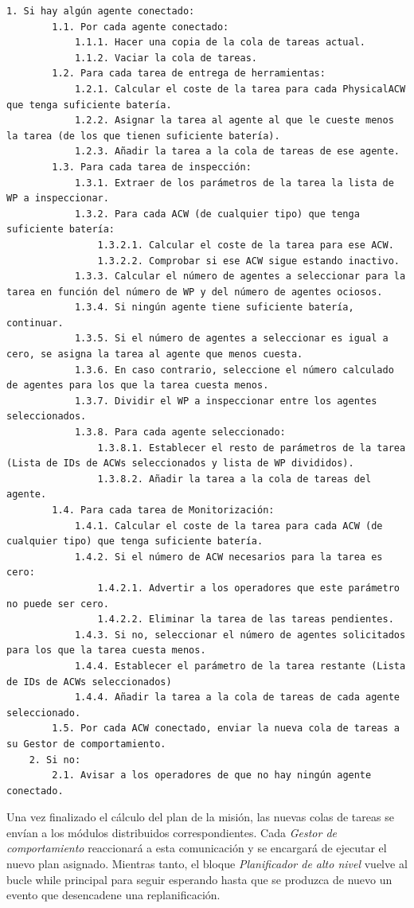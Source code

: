 \documentclass[fontsize=11pt, English=false, Español=true, Myfinal=true, twoside, numbers=noenddot]{scrbook}
\begin{document}
\begin{lstlisting}[caption={Pseudocódigo de la función que hace la planifiación de tareas}, breaklines=true, label=ps:performTaskAllocation]
	1. Si hay algún agente conectado:
		1.1. Por cada agente conectado:
			1.1.1. Hacer una copia de la cola de tareas actual.
			1.1.2. Vaciar la cola de tareas.
		1.2. Para cada tarea de entrega de herramientas:
			1.2.1. Calcular el coste de la tarea para cada PhysicalACW que tenga suficiente batería.
			1.2.2. Asignar la tarea al agente al que le cueste menos la tarea (de los que tienen suficiente batería).
			1.2.3. Añadir la tarea a la cola de tareas de ese agente.
		1.3. Para cada tarea de inspección:
			1.3.1. Extraer de los parámetros de la tarea la lista de WP a inspeccionar.
			1.3.2. Para cada ACW (de cualquier tipo) que tenga suficiente batería:
				1.3.2.1. Calcular el coste de la tarea para ese ACW. 
				1.3.2.2. Comprobar si ese ACW sigue estando inactivo.
			1.3.3. Calcular el número de agentes a seleccionar para la tarea en función del número de WP y del número de agentes ociosos.
			1.3.4. Si ningún agente tiene suficiente batería, continuar.
			1.3.5. Si el número de agentes a seleccionar es igual a cero, se asigna la tarea al agente que menos cuesta.
			1.3.6. En caso contrario, seleccione el número calculado de agentes para los que la tarea cuesta menos.
			1.3.7. Dividir el WP a inspeccionar entre los agentes seleccionados.
			1.3.8. Para cada agente seleccionado:
				1.3.8.1. Establecer el resto de parámetros de la tarea (Lista de IDs de ACWs seleccionados y lista de WP divididos).
				1.3.8.2. Añadir la tarea a la cola de tareas del agente.
		1.4. Para cada tarea de Monitorización:
			1.4.1. Calcular el coste de la tarea para cada ACW (de cualquier tipo) que tenga suficiente batería.
			1.4.2. Si el número de ACW necesarios para la tarea es cero:
				1.4.2.1. Advertir a los operadores que este parámetro no puede ser cero.
				1.4.2.2. Eliminar la tarea de las tareas pendientes.
			1.4.3. Si no, seleccionar el número de agentes solicitados para los que la tarea cuesta menos.
			1.4.4. Establecer el parámetro de la tarea restante (Lista de IDs de ACWs seleccionados)
			1.4.4. Añadir la tarea a la cola de tareas de cada agente seleccionado.
		1.5. Por cada ACW conectado, enviar la nueva cola de tareas a su Gestor de comportamiento.
	2. Si no:
		2.1. Avisar a los operadores de que no hay ningún agente conectado.
\end{lstlisting}

Una vez finalizado el cálculo del plan de la misión, las nuevas colas de tareas se envían a los módulos distribuidos correspondientes. Cada \emph{Gestor de comportamiento} reaccionará a esta comunicación y se encargará de ejecutar el nuevo plan asignado. Mientras tanto, el bloque \emph{Planificador de alto nivel} vuelve al bucle while principal para seguir esperando hasta que se produzca de nuevo un evento que desencadene una replanificación.
\end{document}
